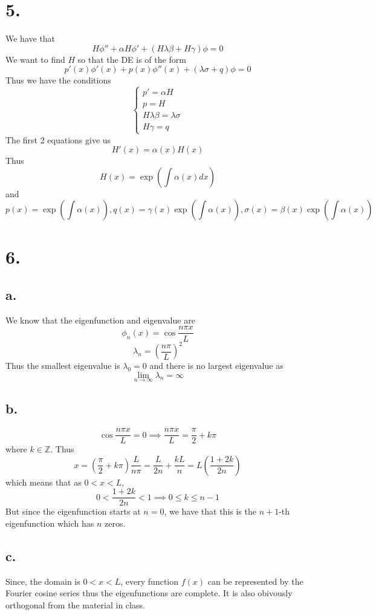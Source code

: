 \documentclass[11pt]{article}
\theoremstyle{mystyle}
\theoremstyle{definition}
\begin{document}
\section*{5.}
We have that 
\[
  H \phi'' + \alpha H \phi' + (H \lambda \beta+ H\gamma) \phi = 0
\]
We want to find $H$ so that the DE is of the form 
\[
  p'(x)\phi'(x) + p(x) \phi''(x) + (\lambda \sigma + q)\phi = 0 
\]
Thus we have the conditions
\[
  \begin{cases}
    p' = \alpha H \\
    p = H \\
    H \lambda \beta = \lambda \sigma \\
    H \gamma = q
  \end{cases}
\]
The first 2 equations give us 
\[
  H'(x) = \alpha(x) H(x)
\]
Thus 
\[
  H(x) = \exp \left(\int \alpha(x) dx \right)
\]
and 
\[
  p(x) = \exp \left(\int \alpha(x) \right), q(x) = \gamma(x) \exp \left(\int \alpha(x) \right), \sigma(x) = \beta(x) \exp \left(\int \alpha(x) \right) 
\]
\newpage
\section*{6.}
\subsection*{a.}
We know that the eigenfunction and eigenvalue are 
\[
  \phi_n(x) = \cos \displaystyle\frac{n\pi x}{L}
\]
\[
  \lambda_n = \left( \displaystyle\frac{n\pi}{L}\right)^2
\]
Thus the smallest eigenvalue is $\lambda_0 = 0$ and there is no largest eigenvalue as 
\[
  \lim_{n \to \infty} \lambda_n = \infty
\]
\subsection*{b.}
\[
  \cos \displaystyle\frac{n\pi x}{L} = 0 \implies \displaystyle\frac{n\pi x}{L} = \displaystyle\frac{\pi}{2} + k\pi
\]
where $k \in \mathbb{Z}$. Thus 
\[
  x = \left(\displaystyle\frac{\pi}{2} + k\pi\right) \displaystyle\frac{L}{n\pi} = \displaystyle\frac{L}{2n} + \displaystyle\frac{kL}{n} = L \left( \displaystyle\frac{1+2k}{2n}\right)
\]
which means that as $0<x<L$, 
\[
  0<\displaystyle\frac{1+2k}{2n} < 1 \implies 0 \le k \le n-1 
\]
But since the eigenfunction starts at $n=0$, we have that this is the $n+1$-th eigenfunction which has $n$ zeros.
\subsection*{c.}
Since, the domain is $0<x<L$, every function $f(x)$ can be represented by the Fourier cosine series thus the eigenfunctions are complete. It is also obivously orthogonal from the material in class. 
\end{document}
